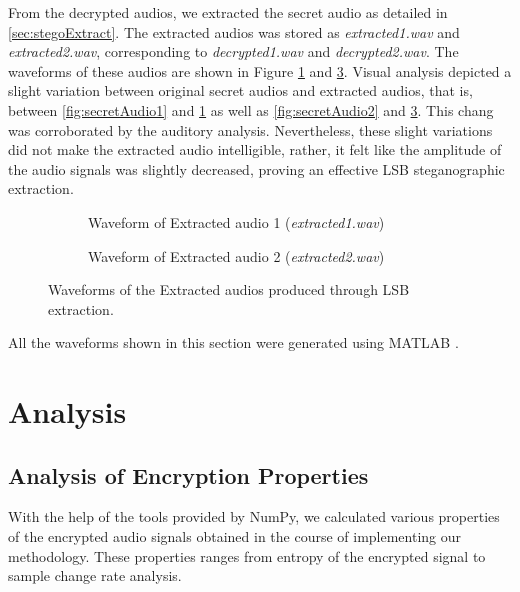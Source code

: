\documentclass[a4paper]{cas-sc}
\begin{document}
From the decrypted audios, we extracted the secret audio as detailed in \ref{sec:stegoExtract}. The extracted audios was stored as \textit{extracted1.wav} and \textit{extracted2.wav}, corresponding to \textit{decrypted1.wav} and \textit{decrypted2.wav}. The waveforms of these audios are shown in Figure \ref{fig:extracted1} and \ref{fig:extracted2}. Visual analysis depicted a slight variation between original secret audios and extracted audios, that is, between \ref{fig:secretAudio1} and \ref{fig:extracted1} as well as \ref{fig:secretAudio2} and \ref{fig:extracted2}. This chang was corroborated by the auditory analysis. Nevertheless, these slight variations did not make the extracted audio intelligible, rather, it felt like the amplitude of the audio signals was slightly decreased, proving an effective LSB steganographic extraction.

\begin{figure}[pos=h]
    \begin{subfigure}[h]{0.45\textwidth}
        \begin{center}
            
            \caption{Waveform of Extracted audio 1 (\textit{extracted1.wav})}
            \label{fig:extracted1}
        \end{center}
    \end{subfigure}
    \hfill
    \begin{subfigure}[h]{0.45\textwidth}
        \begin{center}
            
            \caption{Waveform of Extracted audio 2 (\textit{extracted2.wav})}
            \label{fig:extracted2}
        \end{center}
    \end{subfigure}
    \caption{Waveforms of the Extracted audios produced through LSB extraction.}
\end{figure}

All the waveforms shown in this section were generated using MATLAB \cite{MATLAB:R2016a}.
\section{Analysis}
\label{sec:analysis}
\subsection{Analysis of Encryption Properties}
With the help of the tools provided by NumPy, we calculated various properties of the encrypted audio signals obtained in the course of implementing our methodology. These properties ranges from entropy of the encrypted signal to sample change rate analysis.
\end{document}
